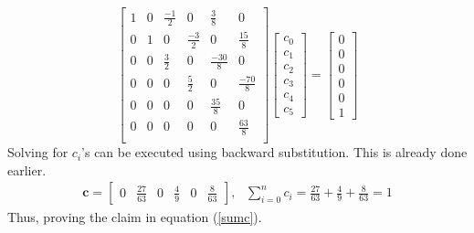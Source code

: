 \begin{equation*}
\begin{bmatrix}
1 & 0 & \frac{-1}{2} & 0 & \frac{3}{8} & 0\\
0 & 1 & 0 & \frac{-3}{2} & 0 & \frac{15}{8}\\
0 & 0 & \frac{3}{2} & 0 & \frac{-30}{8} & 0\\
0 & 0 & 0 & \frac{5}{2} & 0 & \frac{-70}{8}\\
0 & 0 & 0 & 0 & \frac{35}{8} & 0\\
0 & 0 & 0 & 0 & 0 & \frac{63}{8}\\
\end{bmatrix}
\begin{bmatrix}
c_0\\c_1\\c_2\\c_3\\c_4\\c_5
\end{bmatrix} = 
\begin{bmatrix}
0\\0\\0\\0\\0\\1
\end{bmatrix}
\end{equation*}
Solving for $c_i$'s can be executed using backward substitution. This is already done earlier.
\begin{align*}
\mathbf{c} = 
\begin{bmatrix}
0 & \frac{27}{63} & 0 & \frac{4}{9} & 0 & \frac{8}{63}
\end{bmatrix}, \:\:\:\sum_{i=0}^{n}c_i = \frac{27}{63} + \frac{4}{9} + \frac{8}{63} = 1
\end{align*}
Thus, proving the claim in equation (\ref{sumc}). \qedsymbol